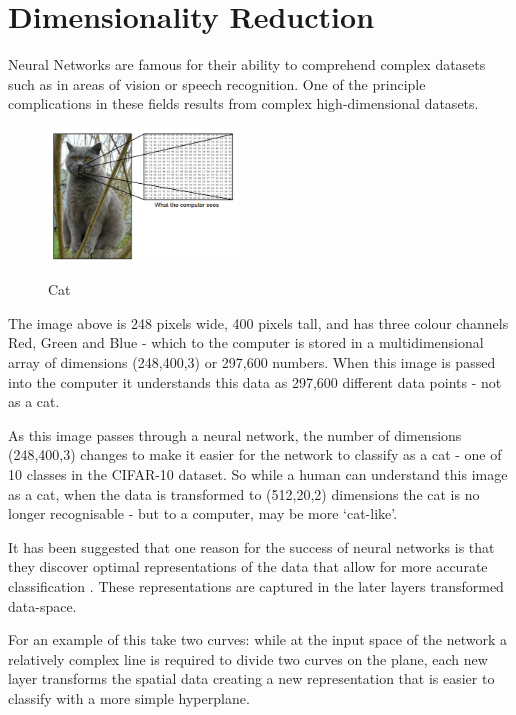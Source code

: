 \documentclass[a4paper,11pt,titlepage]{article}
\begin{document}
\section{Dimensionality Reduction}

Neural Networks are famous for their ability to comprehend complex datasets such as in areas of vision or speech recognition. One of the principle complications in these fields results from complex high-dimensional datasets.

 	\begin{figure}[H]
    			\centering	
			{{\includegraphics[width=0.45\textwidth]
    				{img/catimage.png} 
    			}}%
    			\caption{Cat}%
    		\label{fig:lascaux}
	\end{figure}
	
	The image above is 248 pixels wide, 400 pixels tall, and has three colour channels Red, Green and Blue - which to the computer is stored in a multidimensional array of dimensions (248,400,3) or 297,600 numbers. When this image is passed into the computer it understands this data as 297,600 different data points - not as a cat.
	\par 
	As this image passes through a neural network, the number of dimensions (248,400,3) changes to make it easier for the network to classify as a cat - one of 10 classes in the CIFAR-10 dataset. So while a human can understand this image as a cat, when the data is transformed to (512,20,2) dimensions the cat is no longer recognisable - but to a computer, may be more `cat-like'.
	\par 
	It has been suggested that one reason for the success of neural networks is that they discover optimal representations of the data that allow for more accurate classification \cite{Hinton1986}. These representations are captured in the later layers transformed data-space.
	\par 
	For an example of this take two curves: while at the input space of the network a relatively complex line is required to divide two curves on the plane, each new layer transforms the spatial data creating a new representation that is easier to classify with a more simple hyperplane.
				
\end{document}
